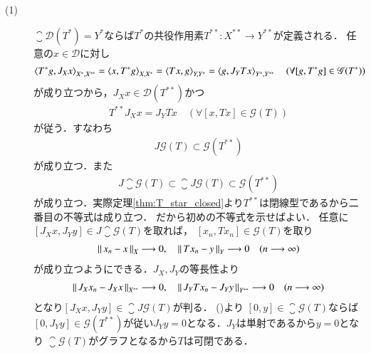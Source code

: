 	\begin{prf}
		\begin{description}
			\item[(1)]
				$\closure{\mathscr{D}(T^*)} = Y^*$ならば$T^*$の共役作用素$T^{**}:X^{**} \rightarrow Y^{**}$が定義される．
				任意の$x \in \mathscr{D}$に対し
				\begin{align}
					\inprod<T^*g,J_Xx>_{X^*,X^{**}} = \inprod<x,T^*g>_{X,X^*} 
					= \inprod<Tx,g>_{Y,Y^*} = \inprod<g,J_YTx>_{Y^*,Y^{**}}
					\quad (\forall [g,T^*g] \in \mathscr{G}(T^*))
				\end{align}
				が成り立つから，$J_Xx \in \mathscr{D}(T^{**})$かつ
				\begin{align}
					T^{**}J_Xx = J_YTx \quad (\forall [x,Tx] \in \mathscr{G}(T))
				\end{align}
				が従う．すなわち
				\begin{align}
					J \mathscr{G}(T) \subset \mathscr{G}(T^{**})
				\end{align}
				が成り立つ．また
				\begin{align}
					J \closure{\mathscr{G}(T)} \subset \closure{J \mathscr{G}(T)} \subset \mathscr{G}(T^{**})
					\label{eq:thm_closablility_and_second_dual_operator_1}
				\end{align}
				が成り立つ．実際定理\ref{thm:T_star_closed}より$T^{**}$は閉線型であるから二番目の不等式は成り立つ．
				だから初めの不等式を示せばよい．
				任意に$[J_Xx,J_Yy] \in J \closure{\mathscr{G}(T)}$を取れば，
				$[x_n,Tx_n] \in \mathscr{G}(T)$を取り
				\begin{align}
					\left\|\, x_n - x\, \right\|_{X} \longrightarrow 0, \quad
					\left\|\, Tx_n - y\, \right\|_{Y} \longrightarrow 0 \quad (n \longrightarrow \infty)
				\end{align}
				が成り立つようにできる．$J_X,J_Y$の等長性より
				\begin{align}
					\left\|\, J_Xx_n - J_Xx\, \right\|_{X^{**}} \longrightarrow 0, \quad
					\left\|\, J_YTx_n - J_Yy\, \right\|_{Y^{**}} \longrightarrow 0 \quad (n \longrightarrow \infty)
				\end{align}
				となり$[J_Xx,J_Yy] \in \closure{J \mathscr{G}(T)}$が判る．
				()より
				$[0,y] \in \closure{\mathscr{G}(T)}$ならば
				$[0,J_Yy] \in \mathscr{G}(T^{**})$が従い$J_Yy = 0$となる．$J_Y$は単射であるから$y = 0$となり
				$\closure{\mathscr{G}(T)}$がグラフとなるから$T$は可閉である．
		\end{description}
	\end{prf}
	
